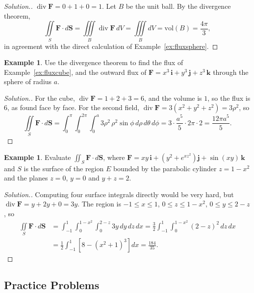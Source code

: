 \documentclass[11pt,a4paper]{article}
\DeclareMathOperator{\dive}{div}
\theoremstyle{definition}
\newtheorem{exa}[thm]{Example}
\newenvironment{solution}
  {\renewcommand{\qedsymbol}{}\begin{proof}[\textit{Solution}.]}
  {\end{proof}}
\begin{document}
\begin{solution}
$\dive \mathbf F = 0 + 1 + 0 = 1$. Let $B$ be the unit ball. By the divergence
theorem,
\[\iint\limits_S \mathbf F\cdot d\mathbf S = \iiint\limits_B \dive \mathbf F\,dV
= \iiint\limits_B dV = \text{vol}(B) = \frac{4\pi}{3},\]
in agreement with the direct calculation of Example~\ref{ex:fluxsphere}.
\end{solution}

\begin{exa}
\label{ex:divcube}
Use the divergence theorem to find the flux of Example~\ref{ex:fluxcube}, and the
outward flux of $\mathbf F = x^3\,\mathbf i + y^3\,\mathbf j + z^3\,\mathbf k$
through the sphere of radius $a$.
\end{exa}

\begin{solution}
For the cube, $\dive\mathbf F = 1 + 2 + 3 = 6$, and the volume is $1$, so the flux
is $6$, as found face by face. For the second field,
$\dive\mathbf F = 3(x^2 + y^2 + z^2) = 3\rho^2$, so
\[\iint\limits_S\mathbf F\cdot d\mathbf S = \int_0^{\pi}\int_0^{2\pi}\int_0^a
3\rho^2\,\rho^2\sin\phi\,d\rho\,d\theta\,d\phi = 3\cdot\frac{a^5}{5}\cdot
2\pi\cdot 2 = \frac{12\pi a^5}{5} .\]
\end{solution}

\begin{exa}
\label{ex:divregion}
Evaluate $\iint_S \mathbf F\cdot d\mathbf S$, where
$\mathbf F = xy\,\mathbf i + \left(y^2 + e^{xz^2}\right)\mathbf j +
\sin(xy)\,\mathbf k$ and $S$ is the surface of the region $E$ bounded by the
parabolic cylinder $z = 1 - x^2$ and the planes $z = 0$, $y = 0$ and $y + z = 2$.
\end{exa}

\begin{solution}
Computing four surface integrals directly would be very hard, but
$\dive\mathbf F = y + 2y + 0 = 3y$. The region is
$-1\leq x\leq 1$, $0\leq z\leq 1 - x^2$, $0\leq y\leq 2 - z$, so
\begin{align*}
\iint\limits_S\mathbf F\cdot d\mathbf S & = \int_{-1}^1\int_0^{1 - x^2}\int_0^{2 -
z}3y\,dy\,dz\,dx = \frac32\int_{-1}^1\int_0^{1 - x^2}(2 - z)^2\,dz\,dx\\
& = \frac12\int_{-1}^1\left[8 - (x^2 + 1)^3\right]dx = \frac{184}{35} .
\end{align*}
\end{solution}


\subsection{Practice Problems}
\end{document}

